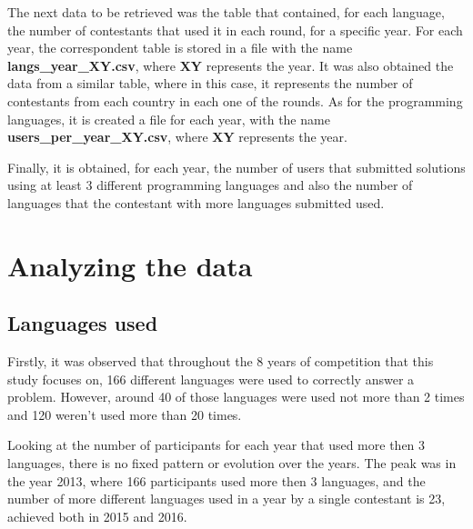 \documentclass{article}
\begin{document}
\begin{multicols*}{2}
The next data to be retrieved was the table that contained, for each language, the number of contestants that used it in each round, for a specific year. For each year, the correspondent table is stored in a file with the name \textbf{langs\_year\_XY.csv}, where \textbf{XY} represents the year.
It was also obtained the data from a similar table, where in this case, it represents the number of contestants from each country in each one of the rounds. As for the programming languages, it is created a file for each year, with the name \textbf{users\_per\_year\_XY.csv}, where \textbf{XY} represents the year.


Finally, it is obtained, for each year, the number of users that submitted solutions using at least 3 different programming languages and also the number of languages that the contestant with more languages submitted used.

\section{Analyzing the data}

\subsection{Languages used}

Firstly, it was observed that throughout the 8 years of competition that this study focuses on, 166 different languages were used to correctly answer a problem. However, around 40 of those languages were used not more than 2 times and 120 weren't used more than 20 times.

Looking at the number of participants for each year that used more then 3 languages, there is no fixed pattern or evolution over the years. The peak was in the year 2013, where 166 participants used more then 3 languages, and the number of more different languages used in a year by a single contestant is 23, achieved both in 2015 and 2016.


\end{multicols*}
\end{document}
